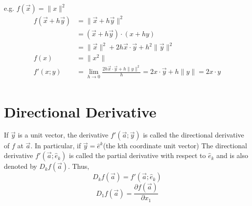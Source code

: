 \documentclass[twoside]{report}
\begin{document}
e.g. $f(\vec{x}) = \|x\|^2$
\begin{align*}
   f(\vec{x} + h\vec{y}) &= \|\vec{x}+h\vec{y}\|^2\\ 
			 &= (\vec{x} + h\vec{y}) \cdot (x+hy) \\ 
			 &= \| \vec{x}\|^2 + 2h\vec{x} \cdot \vec{y} + h^2 \| \vec{y} \|^2 \\ 
   f(x) &= \|x^2\| \\
   f'(x;y) &= \lim_{h \rightarrow 0} \frac{2h\vec{x}\cdot \vec{y} + h \|y\|^2}{h} = 2x\cdot \vec{y} + h\|y\| = 2x\cdot y \\
\end{align*}

\section{Directional Derivative} %
\label{sec:directional_derivative}
\begin{definition}
   If $\vec{y}$ is a unit vector, the derivative $f'(\vec{a};\vec{y})$ is called the directional derivative of $f$ at $\vec{a}$. In particular, if $\vec{y} = \hat{e}^k$(the kth coordinate unit vector) The directional derivative $f'(\vec{a}; \hat{e}_k)$ is called the partial derivative with respect to $\hat{e}_k$ and is also denoted by $D_k f(\vec{a})$. Thus,
   \[
   	D_k f(\vec{a}) = f'(\vec{a};\hat{e}_k)
   \]
   \[
      D_1 f(\vec{a}) = \frac{\partial f(\vec{a})}{\partial x_1}
   \]
\end{definition}
\end{document}
